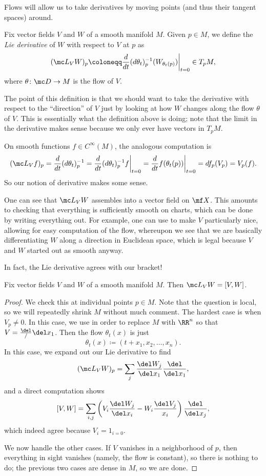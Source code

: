 \documentclass[../notes.tex]{subfiles}
\begin{document}
Flows will allow us to take derivatives by moving points (and thus their tangent spaces) around.
\begin{definition}
	Fix vector fields $V$ and $W$ of a smooth manifold $M$. Given $p\in M$, we define the \textit{Lie derivative} of $W$ with respect to $V$ at $p$ as
	\[(\mc L_VW)_p\coloneqq\frac d{dt}(d\theta_{t})_p^{-1}(W_{\theta_t(p)})\bigg|_{t=0}\in T_pM,\]
	where $\theta\colon\mc D\to M$ is the flow of $V$.
\end{definition}
The point of this definition is that we should want to take the derivative with respect to the ``direction'' of $V$ just by looking at how $W$ changes along the flow $\theta$ of $V$. This is essentially what the definition above is doing; note that the limit in the derivative makes sense because we only ever have vectors in $T_pM$.
\begin{remark}
	On smooth functions $f\in C^\infty(M)$, the analogous computation is
	\[(\mc L_Vf)_p=\frac d{dt}(d\theta_t)_p^{-1}=\frac d{dt}(d\theta_t)_p^{-1}f\bigg|_{t=0}=\frac d{dt}f(\theta_t(p))\bigg|_{t=0}=df_p(V_p)=V_p(f).\]
	So our notion of derivative makes some sense.
\end{remark}
\begin{remark}
	One can see that $\mc L_VW$ assembles into a vector field on $\mf X$. This amounts to checking that everything is sufficiently smooth on charts, which can be done by writing everything out. For example, one can use  to make $V$ particularly nice, allowing for easy computation of the flow, whereupon we see that we are basically differentiating $W$ along a direction in Euclidean space, which is legal because $V$ and $W$ started out as smooth anyway.
\end{remark}
In fact, the Lie derivative agrees with our bracket!
\begin{proposition}
	Fix vector fields $V$ and $W$ of a smooth manifold $M$. Then $\mc L_VW=[V,W]$.
\end{proposition}
\begin{proof}
	We check this at individual points $p\in M$. Note that the question is local, so we will repeatedly shrink $M$ without much comment. The hardest case is when $V_p\ne0$. In this case, we use  in order to replace $M$ with $\RR^n$ so that $V=\frac\del/\del x_1$. Then the flow $\theta_t(x)$ is just
	\[\theta_t(x)\coloneqq(t+x_1,x_2,\ldots,x_n).\]
	In this case, we expand out our Lie derivative to find
	\[(\mc L_VW)_p=\sum_j\frac{\del W_j}{\del x_1}\frac{\del}{\del x_1},\]
	and a direct computation shows
	\[[V,W]=\sum_{i,j}\left(V_i\frac{\del W_j}{\del x_i}-W_i\frac{\del V_j}{x_i}\right)\frac{\del}{\del x_j},\]
	which indeed agree because $V_i=1_{i=0}$.
	
	We now handle the other cases. If $V$ vanishes in a neighborhood of $p$, then everything in sight vanishes (namely, the flow is constant), so there is nothing to do; the previous two cases are dense in $M$, so we are done.
\end{proof}
\end{document}
